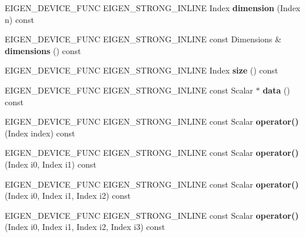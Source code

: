 \begin{DoxyCompactItemize}
E\+I\+G\+E\+N\+\_\+\+D\+E\+V\+I\+C\+E\+\_\+\+F\+U\+NC E\+I\+G\+E\+N\+\_\+\+S\+T\+R\+O\+N\+G\+\_\+\+I\+N\+L\+I\+NE Index {\bfseries dimension} (Index n) const
\item 
\mbox{\label{class_eigen_1_1_tensor_ref_a2c38ecc723df092fbc32a1fc1b3e7e64}} 
E\+I\+G\+E\+N\+\_\+\+D\+E\+V\+I\+C\+E\+\_\+\+F\+U\+NC E\+I\+G\+E\+N\+\_\+\+S\+T\+R\+O\+N\+G\+\_\+\+I\+N\+L\+I\+NE const Dimensions \& {\bfseries dimensions} () const
\item 
\mbox{\label{class_eigen_1_1_tensor_ref_afcb7bafd174509c22f7ab4c9fbc61ed4}} 
E\+I\+G\+E\+N\+\_\+\+D\+E\+V\+I\+C\+E\+\_\+\+F\+U\+NC E\+I\+G\+E\+N\+\_\+\+S\+T\+R\+O\+N\+G\+\_\+\+I\+N\+L\+I\+NE Index {\bfseries size} () const
\item 
\mbox{\label{class_eigen_1_1_tensor_ref_aa15f5c0740dfac2769e31a3356a8db96}} 
E\+I\+G\+E\+N\+\_\+\+D\+E\+V\+I\+C\+E\+\_\+\+F\+U\+NC E\+I\+G\+E\+N\+\_\+\+S\+T\+R\+O\+N\+G\+\_\+\+I\+N\+L\+I\+NE const Scalar $\ast$ {\bfseries data} () const
\item 
\mbox{\label{class_eigen_1_1_tensor_ref_af2d8a0861ccb8ca92170be087a2e78d4}} 
E\+I\+G\+E\+N\+\_\+\+D\+E\+V\+I\+C\+E\+\_\+\+F\+U\+NC E\+I\+G\+E\+N\+\_\+\+S\+T\+R\+O\+N\+G\+\_\+\+I\+N\+L\+I\+NE const Scalar {\bfseries operator()} (Index index) const
\item 
\mbox{\label{class_eigen_1_1_tensor_ref_ac573488a34ff25e70a857005381206f3}} 
E\+I\+G\+E\+N\+\_\+\+D\+E\+V\+I\+C\+E\+\_\+\+F\+U\+NC E\+I\+G\+E\+N\+\_\+\+S\+T\+R\+O\+N\+G\+\_\+\+I\+N\+L\+I\+NE const Scalar {\bfseries operator()} (Index i0, Index i1) const
\item 
\mbox{\label{class_eigen_1_1_tensor_ref_aaf8233e85fc456f3c03264e20fcf9b50}} 
E\+I\+G\+E\+N\+\_\+\+D\+E\+V\+I\+C\+E\+\_\+\+F\+U\+NC E\+I\+G\+E\+N\+\_\+\+S\+T\+R\+O\+N\+G\+\_\+\+I\+N\+L\+I\+NE const Scalar {\bfseries operator()} (Index i0, Index i1, Index i2) const
\item 
\mbox{\label{class_eigen_1_1_tensor_ref_a92d67026d3e3d1ec5387ecebccc3a1a3}} 
E\+I\+G\+E\+N\+\_\+\+D\+E\+V\+I\+C\+E\+\_\+\+F\+U\+NC E\+I\+G\+E\+N\+\_\+\+S\+T\+R\+O\+N\+G\+\_\+\+I\+N\+L\+I\+NE const Scalar {\bfseries operator()} (Index i0, Index i1, Index i2, Index i3) const

\end{DoxyCompactItemize}
